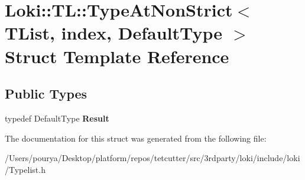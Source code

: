 \hypertarget{structLoki_1_1TL_1_1TypeAtNonStrict}{}\section{Loki\+:\+:T\+L\+:\+:Type\+At\+Non\+Strict$<$ T\+List, index, Default\+Type $>$ Struct Template Reference}
\label{structLoki_1_1TL_1_1TypeAtNonStrict}
\subsection*{Public Types}
\begin{DoxyCompactItemize}
\item 
\hypertarget{structLoki_1_1TL_1_1TypeAtNonStrict_ad1476f3935a65776802a66122dc6baf1}{}typedef Default\+Type {\bfseries Result}\label{structLoki_1_1TL_1_1TypeAtNonStrict_ad1476f3935a65776802a66122dc6baf1}

\end{DoxyCompactItemize}


The documentation for this struct was generated from the following file\+:\begin{DoxyCompactItemize}
\item 
/\+Users/pourya/\+Desktop/platform/repos/tetcutter/src/3rdparty/loki/include/loki/Typelist.\+h\end{DoxyCompactItemize}
